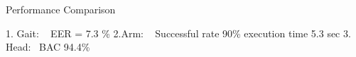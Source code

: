 Performance Comparison

1. Gait: ~\cite{gafurov2006biometric} EER  = 7.3 \%
2.Arm: ~\cite{ahmed2015checksum} Successful rate 90\% execution time 5.3 sec
3. Head:~\cite{rogers2015approach} BAC 94.4\%